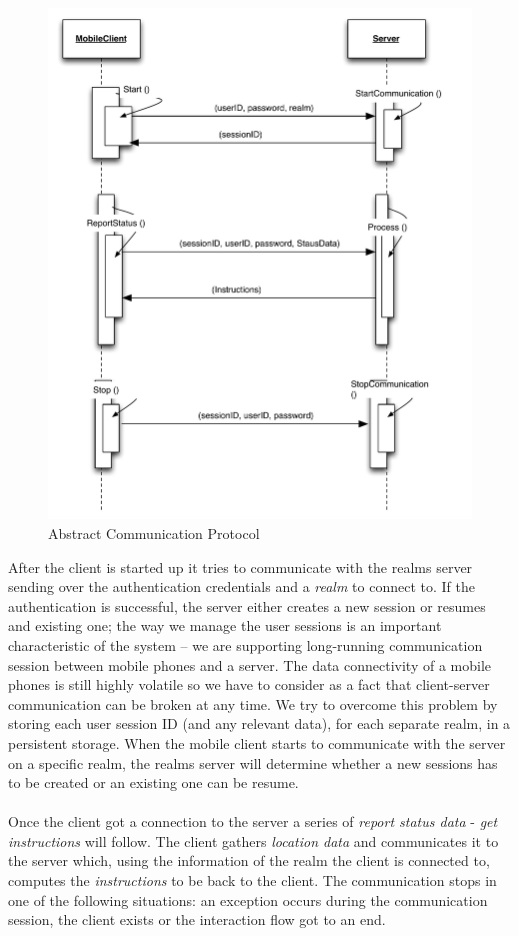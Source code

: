 \begin{figure}[H]
	\centering
	\includegraphics[width=0.9\linewidth]{fig/abstract_communication_protocol}
	\caption{Abstract Communication Protocol}
	\label{fig.design.comm_protocol}
\end{figure}
After the client is started up it tries to communicate with the realms server sending over the authentication credentials and a \emph{realm} to connect to. If the authentication is successful, the server either creates a new session or resumes and existing one; the way we manage the user sessions is an important characteristic of the system -- we are supporting long-running communication session between mobile phones and a server. The data connectivity of a mobile phones is still highly volatile so we have to consider as a fact that client-server communication can be broken at any time. We try to overcome this problem by storing each user session ID (and any relevant data), for each separate realm, in a persistent storage. When the mobile client starts to communicate with the server on a specific realm, the realms server will determine whether a new sessions has to be created or an existing one can be resume.
\\\\
Once the client got a connection to the server a series of \emph{report status data} - \emph{get instructions} will follow. The client gathers \emph{location data} and communicates it to the server which, using the information of the realm the client is connected to, computes the \emph{instructions} to be back to the client. The communication stops in one of the following situations: an exception occurs during the communication session, the client exists or the interaction flow got to an end.
